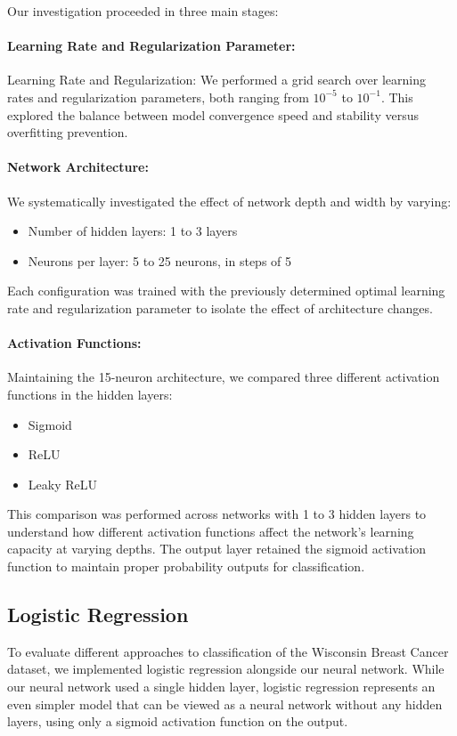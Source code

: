 Our investigation proceeded in three main stages:

\paragraph*{Learning Rate and Regularization Parameter:}
Learning Rate and Regularization: We performed a grid search over learning rates and regularization parameters, both ranging from \( 10^{-5} \) to \( 10^{-1} \). This explored the balance between model convergence speed and stability versus overfitting prevention.

\paragraph*{Network Architecture:}
We systematically investigated the effect of network depth and width by varying:
\begin{itemize}
    \item Number of hidden layers: 1 to 3 layers
    \item Neurons per layer: 5 to 25 neurons, in steps of 5
\end{itemize}
Each configuration was trained with the previously determined optimal learning rate and regularization parameter to isolate the effect of architecture changes.

\paragraph*{Activation Functions:}
Maintaining the 15-neuron architecture, we compared three different activation functions in the hidden layers:
\begin{itemize}
    \item Sigmoid
    \item ReLU
    \item Leaky ReLU
\end{itemize}
This comparison was performed across networks with 1 to 3 hidden layers to understand how different activation functions affect the network's learning capacity at varying depths. The output layer retained the sigmoid activation function to maintain proper probability outputs for classification.

\subsection{Logistic Regression}
To evaluate different approaches to classification of the Wisconsin Breast Cancer dataset, we implemented logistic regression alongside our neural network. While our neural network used a single hidden layer, logistic regression represents an even simpler model that can be viewed as a neural network without any hidden layers, using only a sigmoid activation function on the output.

